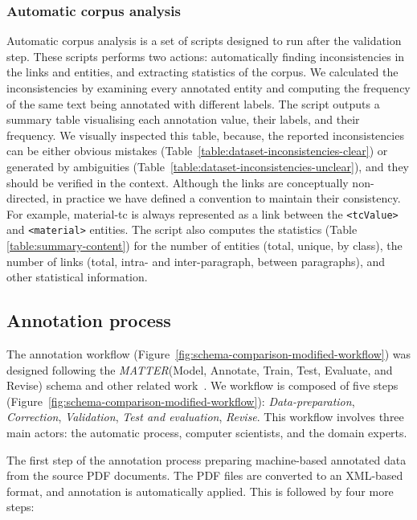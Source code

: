 \documentclass[fleqn,10pt]{wlscirep}
\begin{document}
\subsubsection*{Automatic corpus analysis}
Automatic corpus analysis is a set of scripts designed to run after the validation step. 
These scripts performs two actions: automatically finding inconsistencies in the links and entities, and extracting statistics of the corpus. 
We calculated the inconsistencies by examining every annotated entity and computing the frequency of the same text being annotated with different labels. 
The script outputs a summary table visualising each annotation value, their labels, and their frequency.
We visually inspected this table, because, the reported inconsistencies can be either obvious mistakes (Table~\ref{table:dataset-inconsistencies-clear}) or generated by ambiguities (Table~\ref{table:dataset-inconsistencies-unclear}), and they should be verified in the context. 
Although the links are conceptually non-directed, in practice we have defined a convention to maintain their consistency. For example, material-tc is always represented as a link between the \texttt{<tcValue>} and \texttt{<material>} entities. 
The script also computes the statistics (Table \ref{table:summary-content}) for the number of entities (total, unique, by class), the number of links (total, intra- and inter-paragraph, between paragraphs), and other statistical information. 

\FloatBarrier
\subsection*{Annotation process}
\label{subsec:annotation-workflow}
The annotation workflow (Figure~\ref{fig:schema-comparison-modified-workflow}) was designed following the \textit{MATTER}(Model, Annotate, Train, Test, Evaluate, and Revise) schema\cite{pustejovsky2012natural}  and other related work~\cite{Dieb2016, Krallinger2015TheCC}.
We workflow is composed of five steps (Figure~\ref{fig:schema-comparison-modified-workflow}): \textit{Data-preparation}, \textit{Correction}, \textit{Validation}, \textit{Test and evaluation}, \textit{Revise}. 
This workflow involves three main actors: the automatic process, computer scientists, and the domain experts.

The first step of the annotation process preparing machine-based annotated data from the source PDF documents. 
The PDF files are converted to an XML-based format, and annotation is automatically applied. 
This is followed by four more steps: 
\end{document}
